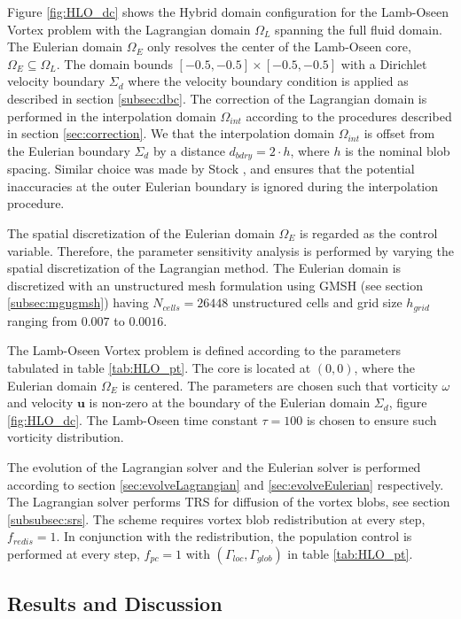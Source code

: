 Figure \ref{fig:HLO_dc} shows the Hybrid domain configuration for the Lamb-Oseen Vortex problem with the Lagrangian domain $\Omega_L$ spanning the full fluid domain. The Eulerian domain $\Omega_E$ only resolves the center of the Lamb-Oseen core, $\Omega_E \subseteq \Omega_L$. The domain bounds $[-0.5,-0.5] \times [-0.5,-0.5]$ with a Dirichlet velocity boundary $\Sigma_d$ where the velocity boundary condition is applied as described in section 
\ref{subsec:dbc}. The correction of the Lagrangian domain is performed in the interpolation domain $\Omega_{int}$ according to the procedures described in section \ref{sec:correction}. We that the interpolation domain $\Omega_{int}$ is offset from the Eulerian boundary $\Sigma_d$ by a distance $d_{bdry} = 2\cdot h$, where $h$ is the nominal blob spacing. Similar choice was made by Stock \cite{Stock2010a}, and ensures that the potential inaccuracies at the outer Eulerian boundary is ignored during the interpolation procedure.  

The spatial discretization of the Eulerian domain $\Omega_E$ is regarded as the control variable. Therefore, the parameter sensitivity analysis is performed by varying the spatial discretization of the Lagrangian method. The Eulerian domain is discretized with an unstructured mesh formulation using GMSH (see section \ref{subsec:mgugmsh}) having $N_{cells} = 26448$ unstructured cells and grid size $h_{grid}$ ranging from $0.007$ to $0.0016$. 

The Lamb-Oseen Vortex problem is defined according to the parameters tabulated in table \ref{tab:HLO_pt}. The core is located at $(0,0)$, where the Eulerian domain $\Omega_E$ is centered. The parameters are chosen such that vorticity $\omega$ and velocity $\mathbf{u}$ is non-zero at the boundary of the Eulerian domain $\Sigma_d$, figure \ref{fig:HLO_dc}. The Lamb-Oseen time constant $\tau = 100$ is chosen to ensure such vorticity distribution.

The evolution of the Lagrangian solver and the Eulerian solver is performed according to section \ref{sec:evolveLagrangian} and \ref{sec:evolveEulerian} respectively. The Lagrangian solver performs TRS for diffusion of the vortex blobs, see section \ref{subsubsec:srs}. The scheme requires vortex blob redistribution at every step, $f_{redis} = 1$. In conjunction with the redistribution, the population control is performed at every step, $f_{pc}=1$ with $(\Gamma_{loc},\Gamma_{glob})$ in table \ref{tab:HLO_pt}. 


\subsection{Results and Discussion}

